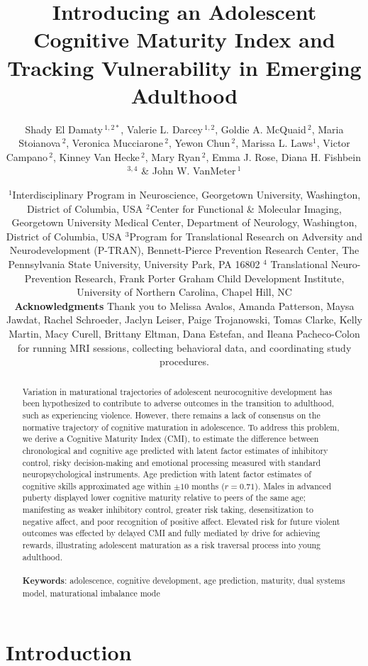 \documentclass{article}%
\title{Introducing an Adolescent Cognitive Maturity Index and Tracking Vulnerability in Emerging Adulthood}
\author{
\parbox{\linewidth}{\centering
Shady El Damaty\,$^{1,2*}$, Valerie L. Darcey\,$^{1,2}$, Goldie A. McQuaid\,$^{2}$, Maria Stoianova\,$^{2}$, Veronica Mucciarone\,$^{2}$, Yewon Chun\,$^{2}$, Marissa L. Laws$^{1}$, Victor Campano\,$^{2}$, Kinney Van Hecke\,$^{2}$, Mary Ryan\,$^{2}$, Emma J. Rose, Diana H. Fishbein\,$^{3,4}$ \& John W. VanMeter\,$^{1}$}
}
\date{\footnotesize{$^{1}$Interdisciplinary Program in Neuroscience, Georgetown University, Washington, District of Columbia, USA
$^{2}$Center for Functional \& Molecular Imaging, Georgetown University Medical Center, Department of Neurology, Washington, District of Columbia, USA
$^{3}$Program for Translational Research on Adversity and Neurodevelopment (P-TRAN), Bennett-Pierce Prevention Research Center, The Pennsylvania State University, University Park, PA 16802
$^{4}$ Translational Neuro-Prevention Research, Frank Porter Graham Child Development Institute, University of Northern Carolina, Chapel Hill, NC} \\  \vspace{5pt} \textbf{Acknowledgments}
Thank you to Melissa Avalos, Amanda Patterson, Maysa Jawdat, Rachel Schroeder, Jaclyn Leiser, Paige Trojanowski, Tomas Clarke, Kelly Martin, Macy Curell, Brittany Eltman, Dana Estefan, and Ileana Pacheco-Colon for running MRI sessions, collecting behavioral data, and coordinating study procedures. }
\begin{document}
\maketitle
\begin{abstract}
Variation in maturational trajectories of adolescent neurocognitive development has been hypothesized to contribute to adverse outcomes in the transition to adulthood, such as experiencing violence. However, there remains a lack of consensus on the normative trajectory of cognitive maturation in adolescence. To address this problem, we derive a Cognitive Maturity Index (CMI), to estimate the difference between chronological and cognitive age predicted with latent factor estimates of inhibitory control, risky decision-making and emotional processing measured with standard neuropsychological instruments. Age prediction with latent factor estimates of cognitive skills approximated age within $\pm 10$ months ($r=0.71$). Males in advanced puberty displayed lower cognitive maturity relative to peers of the same age; manifesting as weaker inhibitory control, greater risk taking, desensitization to negative affect, and poor recognition of positive affect. Elevated risk for future violent outcomes was effected by delayed CMI and fully mediated by drive for achieving rewards, illustrating adolescent maturation as a risk traversal process into young adulthood. \\ \\
\textbf{Keywords}: adolescence, cognitive development, age prediction, maturity, dual systems model, maturational imbalance mode
\end{abstract}
\section*{Introduction}
\end{document}
